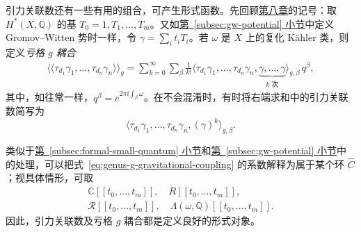 引力关联数还有一些有用的组合，可产生形式函数。先回顾\hyperref[chap:quantum-cohomology]{第八章}的记号：取 $H^*(X,\mathbb Q)$ 的基 $T_0=1,T_1,\ldots,T_m$。又如\hyperref[subsec:gw-potential]{第~\ref*{subsec:gw-potential} 小节}中定义 Gromov--Witten 势时一样，令 $\gamma=\sum_i t_iT_i$。若 $\omega$ 是 $X$ 上的复化 Kähler 类，则定义\emph{亏格 $g$ 耦合}
\begin{equation}\label{eq:genus-g-gravitational-coupling}
\begin{aligned}
\langle\!\langle\tau_{d_1}\gamma_1,\ldots,\tau_{d_n}\gamma_n\rangle\!\rangle_g
=\sum_{k=0}^{\infty}\sum_\beta\frac1{k!}
\langle\tau_{d_1}\gamma_1,\ldots,\tau_{d_n}\gamma_n,
\underbrace{\gamma,\ldots,\gamma}_{k\text{ 次}}\rangle_{g,\beta}\,q^\beta,
\end{aligned}
\end{equation}
其中，如往常一样，$q^\beta=e^{2\pi i\int_\beta\omega}$。在不会混淆时，有时将右端求和中的引力关联数简写为
\[
\langle\tau_{d_1}\gamma_1,\ldots,\tau_{d_n}\gamma_n,(\gamma)^k\rangle_{g,\beta}.
\]

类似于\hyperref[subsec:formal-small-quantum]{第~\ref*{subsec:formal-small-quantum} 小节}和\hyperref[subsec:gw-potential]{第~\ref*{subsec:gw-potential} 小节}中的处理，可以把式~\eqref{eq:genus-g-gravitational-coupling} 的系数解释为属于某个环 $\widehat C$；视具体情形，可取
\[
\begin{gathered}
\mathbb C[[t_0,\ldots,t_m]],\quad R[[t_0,\ldots,t_m]],\\
\mathcal R[[t_0,\ldots,t_m]],\quad
\Lambda(\omega,\mathbb Q)[[t_0,\ldots,t_m]].
\end{gathered}
\]
因此，引力关联数及亏格 $g$ 耦合都是定义良好的形式对象。

